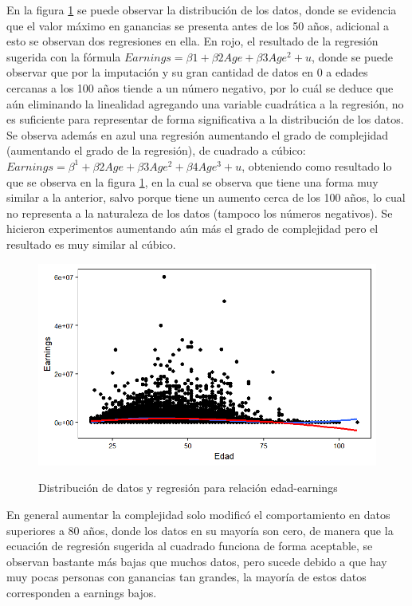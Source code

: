 \documentclass[11pt,a4paper]{article}
\begin{document}
En la figura \ref{fig:RegAgeEarnings} se puede observar la distribución de los datos, donde se evidencia que el valor máximo en ganancias se presenta antes de los 50 años, adicional a esto se observan dos regresiones en ella. En rojo, el resultado de la regresión sugerida con la fórmula $Earnings = \beta1 + \beta2Age + \beta3Age^2 + u$, donde se puede observar que por la imputación y su gran cantidad de datos en 0 a edades cercanas a los 100 años tiende a un número negativo, por lo cuál se deduce que aún eliminando la linealidad agregando una variable cuadrática a la regresión, no es suficiente para representar de forma significativa a la distribución de los datos. Se observa además en azul una regresión aumentando el grado de complejidad (aumentando el grado de la regresión), de cuadrado a cúbico: $Earnings = \beta^1 + \beta2Age + \beta3Age^2 + \beta4Age^3 + u$, obteniendo como resultado lo que se observa en la figura \ref{fig:RegAgeEarnings}, en la cual se observa que tiene una forma muy similar a la anterior, salvo porque tiene un aumento cerca de los 100 años, lo cual no representa a la naturaleza de los datos (tampoco los números negativos). Se hicieron experimentos aumentando aún más el grado de complejidad pero el resultado es muy similar al cúbico.

\begin{figure}[H]
    \centering
    \caption{Distribución de datos y regresión para relación edad-earnings}
    \includegraphics[width=\textwidth]{../views/LR_age_earnings.png}
    \label{fig:RegAgeEarnings}
\end{figure}

En general aumentar la complejidad solo modificó el comportamiento en datos superiores a 80 años, donde los datos en su mayoría son cero, de manera que la ecuación de regresión sugerida al cuadrado funciona de forma aceptable, se observan bastante más bajas que muchos datos, pero sucede debido a que hay muy pocas personas con ganancias tan grandes, la mayoría de estos datos corresponden a earnings bajos.
\end{document}
